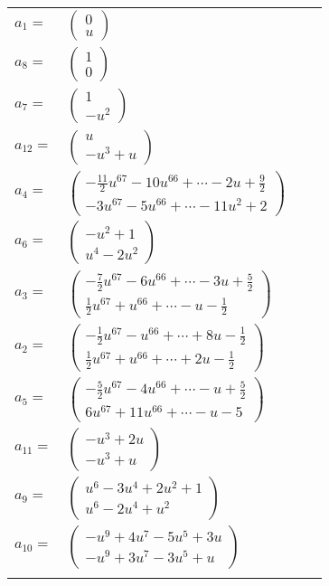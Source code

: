 \documentclass[1p]{elsarticle_modified}
\theoremstyle{definition}
\begin{document}
\begin{tabular}{m{7pt} m{180pt} m{7pt} m{180pt} }
\flushright $a_{1}=$&$\begin{pmatrix}0\\u\end{pmatrix}$ \\
\flushright $a_{8}=$&$\begin{pmatrix}1\\0\end{pmatrix}$ \\
\flushright $a_{7}=$&$\begin{pmatrix}1\\- u^2\end{pmatrix}$ \\
\flushright $a_{12}=$&$\begin{pmatrix}u\\- u^3+u\end{pmatrix}$ \\
\flushright $a_{4}=$&$\begin{pmatrix}-\frac{11}{2} u^{67}-10 u^{66}+\cdots-2 u+\frac{9}{2}\\-3 u^{67}-5 u^{66}+\cdots-11 u^2+2\end{pmatrix}$ \\
\flushright $a_{6}=$&$\begin{pmatrix}- u^2+1\\u^4-2 u^2\end{pmatrix}$ \\
\flushright $a_{3}=$&$\begin{pmatrix}-\frac{7}{2} u^{67}-6 u^{66}+\cdots-3 u+\frac{5}{2}\\\frac{1}{2} u^{67}+u^{66}+\cdots- u-\frac{1}{2}\end{pmatrix}$ \\
\flushright $a_{2}=$&$\begin{pmatrix}-\frac{1}{2} u^{67}- u^{66}+\cdots+8 u-\frac{1}{2}\\\frac{1}{2} u^{67}+u^{66}+\cdots+2 u-\frac{1}{2}\end{pmatrix}$ \\
\flushright $a_{5}=$&$\begin{pmatrix}-\frac{5}{2} u^{67}-4 u^{66}+\cdots- u+\frac{5}{2}\\6 u^{67}+11 u^{66}+\cdots- u-5\end{pmatrix}$ \\
\flushright $a_{11}=$&$\begin{pmatrix}- u^3+2 u\\- u^3+u\end{pmatrix}$ \\
\flushright $a_{9}=$&$\begin{pmatrix}u^6-3 u^4+2 u^2+1\\u^6-2 u^4+u^2\end{pmatrix}$ \\
\flushright $a_{10}=$&$\begin{pmatrix}- u^9+4 u^7-5 u^5+3 u\\- u^9+3 u^7-3 u^5+u\end{pmatrix}$\\&\end{tabular}
\end{document}
